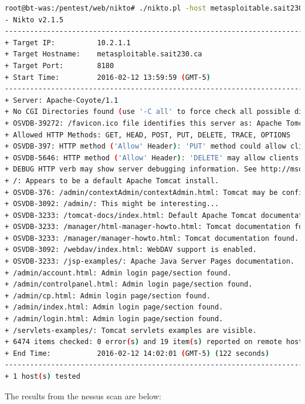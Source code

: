 \documentclass{article}
\begin{document}
\begin{lstlisting}[language=Bash]
root@bt-was:/pentest/web/nikto# ./nikto.pl -host metasploitable.sait230.ca -p 8180
- Nikto v2.1.5
---------------------------------------------------------------------------
+ Target IP:          10.2.1.1
+ Target Hostname:    metasploitable.sait230.ca
+ Target Port:        8180
+ Start Time:         2016-02-12 13:59:59 (GMT-5)
---------------------------------------------------------------------------
+ Server: Apache-Coyote/1.1
+ No CGI Directories found (use '-C all' to force check all possible dirs)
+ OSVDB-39272: /favicon.ico file identifies this server as: Apache Tomcat
+ Allowed HTTP Methods: GET, HEAD, POST, PUT, DELETE, TRACE, OPTIONS 
+ OSVDB-397: HTTP method ('Allow' Header): 'PUT' method could allow clients to save files on the web server.
+ OSVDB-5646: HTTP method ('Allow' Header): 'DELETE' may allow clients to remove files on the web server.
+ DEBUG HTTP verb may show server debugging information. See http://msdn.microsoft.com/en-us/library/e8z01xdh%28VS.80%29.aspx for details.
+ /: Appears to be a default Apache Tomcat install.
+ OSVDB-376: /admin/contextAdmin/contextAdmin.html: Tomcat may be configured to let attackers read arbitrary files. Restrict access to /admin.
+ OSVDB-3092: /admin/: This might be interesting...
+ OSVDB-3233: /tomcat-docs/index.html: Default Apache Tomcat documentation found.
+ OSVDB-3233: /manager/html-manager-howto.html: Tomcat documentation found.
+ OSVDB-3233: /manager/manager-howto.html: Tomcat documentation found.
+ OSVDB-3092: /webdav/index.html: WebDAV support is enabled.
+ OSVDB-3233: /jsp-examples/: Apache Java Server Pages documentation.
+ /admin/account.html: Admin login page/section found.
+ /admin/controlpanel.html: Admin login page/section found.
+ /admin/cp.html: Admin login page/section found.
+ /admin/index.html: Admin login page/section found.
+ /admin/login.html: Admin login page/section found.
+ /servlets-examples/: Tomcat servlets examples are visible.
+ 6474 items checked: 0 error(s) and 19 item(s) reported on remote host
+ End Time:           2016-02-12 14:02:01 (GMT-5) (122 seconds)
---------------------------------------------------------------------------
+ 1 host(s) tested
\end{lstlisting}

The results from the nessus scan are below:
\end{document}

